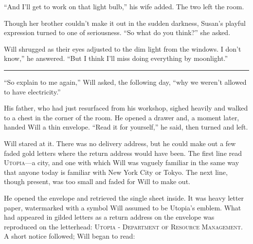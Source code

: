 \documentclass[12pt,letterpaper,oneside,english]{book}
\begin{document}
``And I'll get to work on that light bulb,'' his wife added.  The two
left the room.

Though her brother couldn't make it out in the sudden darkness, Susan's
playful expression turned to one of seriousness. ``So what do you
think?'' she asked.

Will shrugged as their eyes adjusted to the dim light from the windows.
I don't know,'' he answered. ``But I think I'll miss doing everything by
moonlight.''

\medskip
{\centering\rule{\linewidth}{1pt}}
\smallskip

``So explain to me again,'' Will asked, the following day, ``why
we weren't allowed to have electricity.''

His father, who had just resurfaced from his workshop, sighed heavily
and walked to a chest in the corner of the room. He opened a drawer
and, a moment later, handed Will a thin envelope. ``Read it for
yourself,'' he said, then turned and left.

Will stared at it. There was no delivery address, but he could make out
a few faded gold letters where the return address would have been. The
first line read \textsc{Utopia}---a city, and one with which Will was
vaguely familiar in the same way that anyone today is familiar with New
York City or Tokyo. The next line, though present, was too small and
faded for Will to make out.

He opened the envelope and retrieved the single sheet inside. It was
heavy letter paper, watermarked with a symbol Will assumed to be
Utopia's emblem. What had appeared in gilded letters as a return address
on the envelope was reproduced on the letterhead: \textsc{Utopia -
Department of Resource Management}.  A short notice followed; Will began
to read:

\medskip
{}
\medskip
\end{document}
